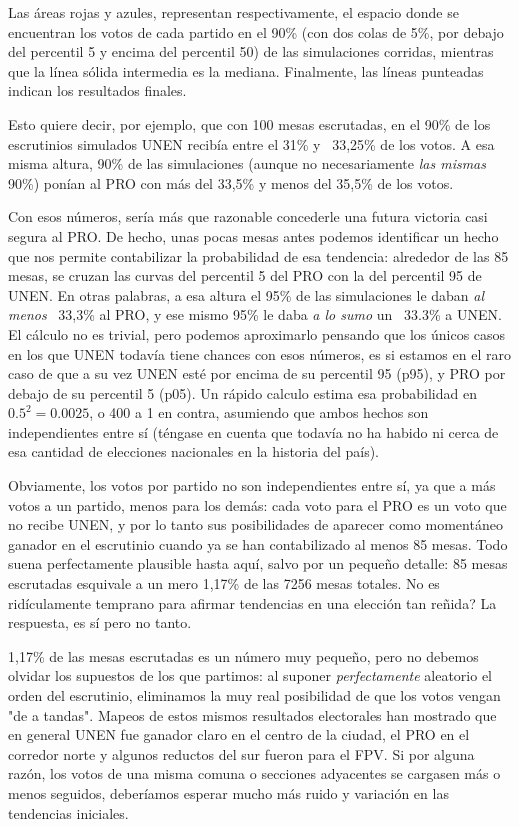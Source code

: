 \documentclass[12pt, a4paper]{article}
\begin{document}
Las \'areas rojas y azules, representan respectivamente, el espacio donde se encuentran los votos de cada partido en el 90\% (con dos colas de 5\%, por debajo del percentil 5 y encima del percentil 50) de las simulaciones corridas, mientras que la l\'inea s\'olida intermedia es la mediana. Finalmente, las l\'ineas punteadas indican los resultados finales.

Esto quiere decir, por ejemplo, que con 100 mesas escrutadas, en el 90\% de los escrutinios simulados UNEN recib\'ia entre el 31\% y ~33,25\% de los votos. A esa misma altura, 90\% de las simulaciones (aunque no necesariamente \emph{las mismas} 90\%) pon\'ian al PRO con m\'as del 33,5\% y menos del 35,5\% de los votos.

Con esos n\'umeros, ser\'ia m\'as que razonable concederle una futura victoria casi segura al PRO. De hecho, unas pocas mesas antes podemos identificar un hecho que nos permite contabilizar la probabilidad de esa tendencia: alrededor de las 85 mesas, se cruzan las curvas del percentil 5 del PRO con la del percentil 95 de UNEN. En otras palabras, a esa altura el 95\% de las simulaciones le daban \emph{al menos} ~33,3\% al PRO, y ese mismo 95\% le daba \emph{a lo sumo} un ~33.3\% a UNEN.
El c\'alculo no es trivial, pero podemos aproximarlo pensando que los \'unicos casos en los que UNEN todav\'ia tiene chances con esos n\'umeros, es si estamos en el raro caso de que a su vez UNEN est\'e por encima de su percentil 95 (p95), y PRO por debajo de su percentil 5 (p05). Un r\'apido calculo estima esa probabilidad en $0.5^{2} = 0.0025$, o 400 a 1 en contra, asumiendo que ambos hechos son independientes entre s\'i (t\'engase en cuenta que todav\'ia no ha habido ni cerca de esa cantidad de elecciones nacionales en la historia del pa\'is).

Obviamente, los votos por partido no son independientes entre s\'i, ya que a m\'as votos a un partido, menos para los dem\'as: cada voto para el PRO es un voto que no recibe UNEN, y por lo tanto sus posibilidades de aparecer como moment\'aneo ganador en el escrutinio cuando ya se han contabilizado al menos 85 mesas. Todo suena perfectamente plausible hasta aqu\'i, salvo por un peque\~no detalle: 85 mesas escrutadas esquivale a un mero 1,17\% de las 7256 mesas totales. No es rid\'iculamente temprano para afirmar tendencias en una elecci\'on tan re\~nida? La respuesta, es s\'i pero no tanto.

1,17\% de las mesas escrutadas es un n\'umero muy peque\~no, pero no debemos olvidar los supuestos de los que partimos: al suponer \emph{perfectamente} aleatorio el orden del escrutinio, eliminamos la muy real posibilidad de que los votos vengan "de a tandas". Mapeos de estos mismos resultados electorales han mostrado que en general UNEN fue ganador claro en el centro de la ciudad, el PRO en el corredor norte y algunos reductos del sur fueron para el FPV. Si por alguna raz\'on, los votos de una misma comuna o secciones adyacentes se cargasen m\'as o menos seguidos, deber\'iamos esperar mucho m\'as ruido y variaci\'on en las tendencias iniciales.
\end{document}
